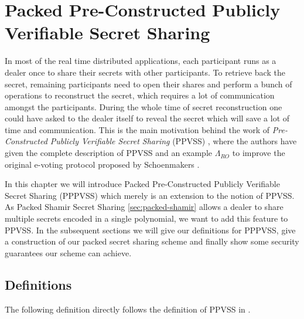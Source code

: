 \chapter{Packed Pre-Constructed Publicly Verifiable Secret Sharing}
\label{cha:2}
In most of the real time distributed applications, each participant runs as a dealer once to share their 
secrets with other participants. To retrieve back the secret, remaining participants need to open their 
shares and perform a bunch of operations to reconstruct the secret, which requires a lot of communication 
amongst the participants. During the whole time of secret reconstruction one could have asked to the dealer 
itself to reveal the secret which will save a lot of time and communication. This is the main motivation 
behind the work of \textit{Pre-Constructed Publicly Verifiable Secret Sharing} (PPVSS) \cite{cryptoeprint:2025/576}, 
where the authors have given the complete description of PPVSS and an example $\Lambda_{RO}$ to improve 
the original e-voting protocol proposed by Schoenmakers \cite{5581ccd9530540479539d21d1d39ae96}.\par

In this chapter we will introduce Packed Pre-Constructed Publicly Verifiable Secret Sharing (PPPVSS) which merely 
is an extension to the notion of PPVSS. As Packed Shamir Secret Sharing \ref{sec:packed-shamir} allows a 
dealer to share multiple secrets encoded in a single polynomial, we want to add this feature to PPVSS. In the 
subsequent sections we will give our definitions for PPPVSS, give a construction of our packed secret sharing 
scheme and finally show some security guarantees our scheme can achieve.\par

\section{Definitions}
\label{sec:pppvss-definitions}

The following definition directly follows the definition of PPVSS in \cite{cryptoeprint:2025/576}.

